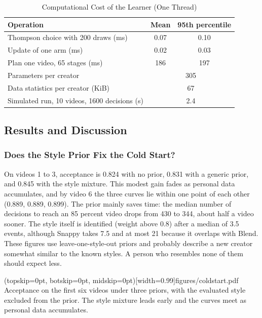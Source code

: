 \documentclass{ieeeaccess}
\begin{document}
\begin{table}[t]
\caption{Computational Cost of the Learner (One Thread)}
\label{tab:runtime}
\setlength{\tabcolsep}{4pt}
\centering
\begin{tabular}{|l|c|c|}
\hline
Operation & Mean & 95th percentile \\
\hline
Thompson choice with 200 draws (ms) & 0.07 & 0.10 \\
Update of one arm (ms) & 0.02 & 0.03 \\
Plan one video, 65 stages (ms) & 186 & 197 \\
\hline
Parameters per creator & \multicolumn{2}{c|}{305} \\
Data statistics per creator (KiB) & \multicolumn{2}{c|}{67} \\
Simulated run, 10 videos, 1600 decisions (s) & \multicolumn{2}{c|}{2.4} \\
\hline
\end{tabular}
\end{table}

\subsection{Results and Discussion}

\subsubsection{Does the Style Prior Fix the Cold Start?}
On videos 1 to 3, acceptance is 0.824 with no prior, 0.831 with a generic prior, and 0.845 with the style mixture. This modest gain fades as personal data accumulates, and by video 6 the three curves lie within one point of each other (0.889, 0.889, 0.899). The prior mainly saves time: the median number of decisions to reach an 85 percent video drops from 430 to 344, about half a video sooner. The style itself is identified (weight above 0.8) after a median of 3.5 events, although Snappy takes 7.5 and at most 21 because it overlaps with Blend. These figures use leave-one-style-out priors and probably describe a new creator somewhat similar to the known styles. A person who resembles none of them should expect less.

\Figure[t!](topskip=0pt, botskip=0pt, midskip=0pt)[width=0.99\columnwidth]{figures/coldstart.pdf}
{Acceptance on the first six videos under three priors, with the evaluated style excluded from the prior. The style mixture leads early and the curves meet as personal data accumulates.\label{fig:cold}}
\end{document}
